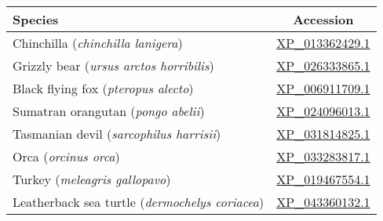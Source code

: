 \newcommand{\specpred}[3]{#1 (\emph{#2}) & \href{https://www.ncbi.nlm.nih.gov/protein/#3}{#3} }

\begin{table}[h!]
    \centering
    \begin{tabular}{lc}
        \hline
        \textbf{Species} & \textbf{Accession} \\
        \hline
        \specpred{Chinchilla}{chinchilla lanigera}{XP_013362429.1} \\
        \specpred{Grizzly bear}{ursus arctos horribilis}{XP_026333865.1} \\
        \specpred{Black flying fox}{pteropus alecto}{XP_006911709.1} \\
        \specpred{Sumatran orangutan}{pongo abelii}{XP_024096013.1} \\
        \specpred{Tasmanian devil}{sarcophilus harrisii}{XP_031814825.1} \\
        \specpred{Orca}{orcinus orca}{XP_033283817.1} \\
        \specpred{Turkey}{meleagris gallopavo}{XP_019467554.1} \\
        \specpred{Leatherback sea turtle}{dermochelys coriacea}{XP_043360132.1} \\
        \hline
    \end{tabular}
\end{table}